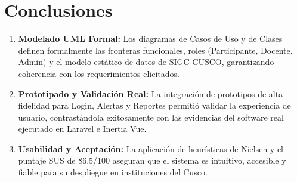 \section{Conclusiones}

\begin{enumerate}[nosep]
    \item \textbf{Modelado UML Formal:} Los diagramas de Casos de Uso y de Clases definen formalmente las fronteras funcionales, roles (Participante, Docente, Admin) y el modelo estático de datos de SIGC-CUSCO, garantizando coherencia con los requerimientos elicitados.
    \item \textbf{Prototipado y Validación Real:} La integración de prototipos de alta fidelidad para Login, Alertas y Reportes permitió validar la experiencia de usuario, contrastándola exitosamente con las evidencias del software real ejecutado en Laravel e Inertia Vue.
    \item \textbf{Usabilidad y Aceptación:} La aplicación de heurísticas de Nielsen y el puntaje SUS de 86.5/100 aseguran que el sistema es intuitivo, accesible y fiable para su despliegue en instituciones del Cusco.
\end{enumerate}
